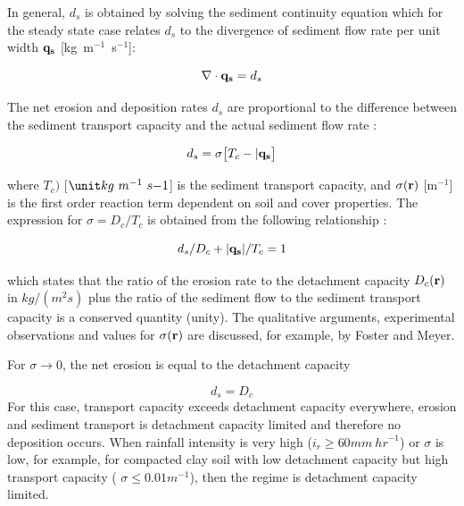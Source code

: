 \documentclass[gmd, manuscript]{copernicus}
\begin{document}
In general, $d_s$ is obtained by solving the sediment continuity equation
which for the steady state case relates $d_s$ to the divergence 
of sediment flow rate per unit width ${\bf q_s}$ [\unit{kg~m}$^{-1}$~\unit{s}$^{-1}$]:

\begin{equation}
\label{eq:steady_sed}
\nabla\cdot {\bf q_s} = d_s 
\end{equation}

The net erosion and deposition rates $d_s$ are proportional to the difference between
the sediment transport capacity and the actual sediment flow rate \cite{fostermeyer72}:

\begin{equation}
\label{eq:sigma}
d_s =\sigma \bigl[ T_c - |{\bf q_s}\bigr]
\end{equation}

\noindent
where $T_c)$ [$\unit kg~m^{-1}~s{-1}$] is the sediment transport capacity,
and $\sigma({\bf r})$ [m$^{-1}$] is the first order reaction term
 dependent on soil and cover properties.
 The expression for $\sigma = D_c / T_c$
is obtained from the following relationship \cite{fostermeyer72}:

\begin{equation}
\label{eq:foster_law}
d_s/D_c + |{\bf q_s}|/T_c = 1
\end{equation}

\noindent
 which states that the ratio of the erosion rate to the detachment
 capacity $D_c ({\bf r})$ in $kg/(m^2s)$ %
 plus the ratio of the sediment flow to the sediment transport capacity is
 a conserved quantity (unity).
The qualitative arguments, experimental observations and values for
 $\sigma({\bf r})$   are discussed, for example, by Foster and Meyer\cite{fostermeyer72}.

For $\sigma \to 0$, the net erosion is equal to the detachment capacity

\begin{equation}
\label{eq:detachment_limited}
 d_s = D_c
\end{equation}
For this case, transport capacity exceeds
detachment capacity everywhere, erosion and sediment transport is detachment
capacity limited and therefore no deposition occurs.
When rainfall intensity is very high ($i_r \geq 60 \unit{mm~hr}^{-1}$)
or $\sigma$ is low, for example, for compacted clay soil with low detachment capacity but
high transport capacity ( $\sigma \leq 0.01 \unit{m}^{-1}$),
then the regime is detachment capacity limited.
\end{document}
